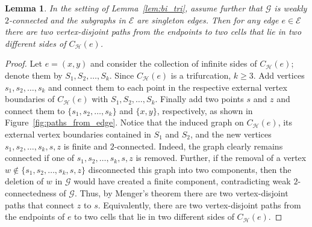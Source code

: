\documentclass{article}
\theoremstyle{plain}
\newtheorem{lem}[thm]{Lemma}
\theoremstyle{definition}
\newcommand{\cG}{\mathcal{G}}
\newcommand{\cE}{\mathcal{E}}
\newcommand{\cH}{\mathcal{H}}
\begin{document}
\begin{lem}%
\label{lem:disj_path}
    In the setting of Lemma~\ref{lem:bi_tri}, assume further that $\cG$ is weakly $2$-connected and the subgraphs in $\cE$ are singleton edges. 
    Then for any edge $e\in \cE$ there are two vertex-disjoint paths from the endpoints to two cells that lie in two different sides of $C_{\cH}(e)$.
\end{lem}
\begin{proof}
    Let $e=(x,y)$ and consider the collection of infinite sides of $C_{\cH}(e)$; denote them by $S_1,S_2,\ldots,S_k$. Since $C_{\cH}(e)$ is a trifurcation, $k \geq 3$. Add vertices $s_1, s_2, \ldots, s_k$ and connect them to each point in the respective external vertex boundaries of $C_{\cH}(e)$ with $S_1, S_2, \ldots, S_k$. Finally add two points $s$ and $z$ and connect them to $\{s_1,s_2,\ldots,s_k\}$ and $\{x,y\}$, respectively, as shown in Figure~\ref{fig:paths_from_edge}. 
    Notice that the induced graph on
    $C_{\cH}(e)$, its external vertex boundaries contained in $S_1$ and $S_2$, and the new vertices $s_1,s_2,\ldots,s_k,s,z$ is finite and $2$-connected. Indeed, the graph clearly remains connected if one of $s_1,s_2,\ldots,s_k,s,z$ is removed. Further, if the removal of a vertex $w\notin \{s_1,s_2,\ldots,s_k,s,z\}$ disconnected this graph into two components, then the deletion of $w$ in $\cG$ would have created a finite component, contradicting weak $2$-connectedness of $\cG$. Thus, by Menger's theorem there are two vertex-disjoint paths that connect $z$ to $s$. Equivalently, there are two vertex-disjoint paths from the endpoints of $e$ to two cells that lie in two different sides of $C_{\cH}(e)$.
\end{proof}
\end{document}

